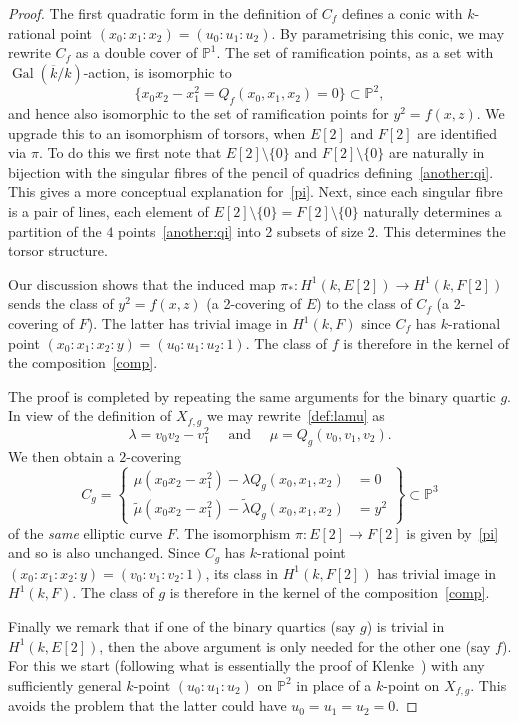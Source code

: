 \documentclass[12pt]{amsart}
\newcommand{\Gal}{{\operatorname{Gal}}}
\newcommand{\PP}{{\mathbb P}}
\newcommand{\kbar}{{\overline k}}
\theoremstyle{definition}
\begin{document}
\begin{proof}
  The first quadratic form in the definition of $C_f$ defines a conic
  with $k$-rational point $(x_0:x_1:x_2) = (u_0:u_1:u_2)$.  By
  parametrising this conic, we may rewrite $C_f$ as a double cover of
  $\PP^1$. The set of ramification points, as a set with
  $\Gal(\kbar/k)$-action, is isomorphic to
  \begin{equation}
   \label{another:qi}
   \{ x_0x_2 - x_1^2 = Q_f(x_0,x_1,x_2) = 0 \} \subset \PP^2,
 \end{equation}  
 and hence also isomorphic to the set of ramification points for
 $y^2 = f(x,z)$.  We upgrade this to an isomorphism of torsors, when
 $E[2]$ and $F[2]$ are identified via $\pi$. To do this we first note
 that $E[2] \setminus \{0\}$ and $F[2] \setminus \{0\}$ are naturally
 in bijection with the singular fibres of the pencil of quadrics
 defining~\eqref{another:qi}.  This gives a more conceptual
 explanation for~\eqref{pi}.  Next, since each singular fibre is a
 pair of lines, each element of
 $E[2] \setminus \{0\} = F[2] \setminus \{0\}$ naturally determines a
 partition of the $4$ points~\eqref{another:qi} into 2 subsets of size
 2.  This determines the torsor structure.

 Our discussion shows that the induced map
 $\pi_* : H^1(k,E[2]) \to H^1(k,F[2])$ sends the class of
 $y^2 = f(x,z)$ (a 2-covering of $E$) to the class of $C_f$ (a
 2-covering of $F$). The latter has trivial image in $H^1(k,F)$ since
 $C_f$ has $k$-rational point $(x_0:x_1:x_2:y) = (u_0:u_1:u_2:1)$.
 The class of $f$ is therefore in the kernel of the
 composition~\eqref{comp}.

  The proof is completed by repeating the same arguments for the
  binary quartic $g$.  In view of the definition of $X_{f,g}$ we may
  rewrite~\eqref{def:lamu} as
  \[ \lambda = v_0 v_2 - v_1^2 \quad \text{ and } \quad
   \mu = Q_g(v_0,v_1,v_2). \]
  We then obtain a $2$-covering
  \[ C_g = \left\{ \begin{aligned} \mu (x_0x_2 - x_1^2) - \lambda
        Q_g(x_0,x_1,x_2) &= 0 \\ \widetilde{\mu} (x_0x_2 - x_1^2) -
        \widetilde{\lambda} Q_g(x_0,x_1,x_2) &= y^2 \end{aligned}
    \right\} \subset \PP^3 \] of the {\em same} elliptic curve $F$. The
  isomorphism $\pi : E[2] \to F[2]$ is given by~\eqref{pi} and so is
  also unchanged.  Since $C_g$ has $k$-rational point
  $(x_0:x_1:x_2:y) = (v_0:v_1:v_2:1)$, its class in $H^1(k,F[2])$
  has trivial image in $H^1(k,F)$.  The class of $g$ is therefore in the
  kernel of the composition~\eqref{comp}.

  Finally we remark that if one of the binary quartics (say $g$)
  is trivial in $H^1(k,E[2])$, then the above argument is only needed
  for the other one (say $f$). For this we start (following what
  is essentially the proof of Klenke~\cite{Klenke}) with any
  sufficiently general $k$-point $(u_0:u_1:u_2)$ on $\PP^2$ in place
  of a $k$-point on $X_{f,g}$. This avoids the problem that the
  latter could have $u_0 = u_1= u_2 = 0$.
\end{proof}
\end{document}
